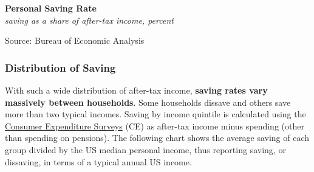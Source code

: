 \documentclass{report}
\makeatletter
\newcommand{\tbllink}[1]{\href{https://raw.githubusercontent.com/bdecon/US-chartbook/master/chartbook/data/#1}{\faTable}}
\newcommand*\short[1]{\expandafter\@gobbletwo\number\numexpr#1\relax}
\newcommand{\dateaxisticks}{
		date coordinates in=x, axis line style={draw=none},
		xmax={2023-11-30},
		max space between ticks=40,	    
		xtick={{1990-01-01}, {1992-01-01}, {1994-01-01}, 
			{1996-01-01}, {1998-01-01}, {2000-01-01}, 
			{2002-01-01}, {2004-01-01}, {2006-01-01},
			{2008-01-01}, {2010-01-01}, {2012-01-01}, {2014-01-01},
		    {2016-01-01}, {2018-01-01}, {2020-01-01}, {2022-01-01}, 
		    {2024-01-01}, {2026-01-01}},
		minor xtick={{1989-01-01}, {1991-01-01}, {1993-01-01},
			{1995-01-01}, {1997-01-01}, {1999-01-01}, 
			{2001-01-01}, {2003-01-01}, {2005-01-01}, {2007-01-01},
		    {2009-01-01}, {2011-01-01}, {2013-01-01}, {2015-01-01},
		    {2017-01-01}, {2019-01-01}, {2021-01-01}, {2023-01-01}, 
		    {2025-01-01}, {2027-01-01}},
		enlarge y limits={0.06}, enlarge x limits={0.01},
		xticklabel style={align=center, yshift=-2pt}, tick label style={inner sep=0pt},
		}
\newcommand{\bbar}[2]{extra #1 ticks = {{#2}}, extra #1 tick labels = ,
		extra #1 tick style = {grid=major, grid style={thick, black!25}},}
\newcommand{\stdline}[4]{\addplot[very thick, no markers, color=#1] 
		table [x=#2, y=#3, col sep=comma] {#4};	}
\newcommand{\rbars}{
		\fill[color=black!10] (axis cs:{1990-07-01},\pgfkeysvalueof{/pgfplots/ymin}) rectangle 
			(axis cs:{1991-03-01}, \pgfkeysvalueof{/pgfplots/ymax});
		\fill[color=black!10] (axis cs:{2007-12-01},\pgfkeysvalueof{/pgfplots/ymin}) rectangle 
			(axis cs:{2009-07-01}, \pgfkeysvalueof{/pgfplots/ymax});
		\fill[color=black!10] (axis cs:{2001-03-01},\pgfkeysvalueof{/pgfplots/ymin}) rectangle 
			(axis cs:{2001-11-01}, \pgfkeysvalueof{/pgfplots/ymax});
		\fill[color=black!10] (axis cs:{2020-02-01},\pgfkeysvalueof{/pgfplots/ymin}) rectangle 
			(axis cs:{2020-05-01}, \pgfkeysvalueof{/pgfplots/ymax});}
\makeatother
\begin{document}
{\begin{minipage}{0.76\textwidth}

\vspace{1mm}

\normalsize \textbf{Personal Saving Rate}\\
\footnotesize{\textit{saving as a share of after-tax income, percent}}
\vspace{3.4cm}

\hspace{2mm} 

\footnotesize{Source: Bureau of Economic Analysis} \hfill \tbllink{psavert.csv}
\vspace{1mm}

\subsubsection*{Distribution of Saving}
\small With such a wide distribution of after-tax income, \textbf{saving rates vary massively between households}. Some households dissave and others save more than two typical incomes. Saving by income quintile is calculated using the \href{https://www.bls.gov/cex/}{Consumer Expenditure Surveys} (CE) as after-tax income minus spending (other than spending on pensions). The following chart shows the average saving of each group divided by the US median personal income, thus reporting saving, or dissaving, in terms of a typical annual US income. 
\vspace{1mm}


\end{minipage}}
\end{document}
